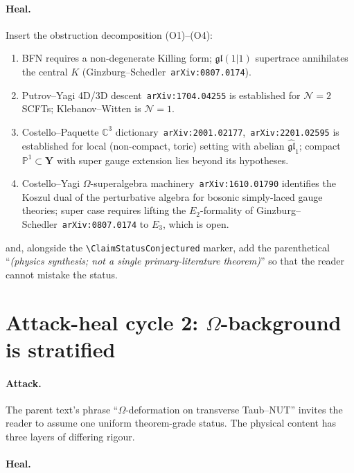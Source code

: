 \documentclass[11pt]{amsart}
\theoremstyle{definition}
\providecommand{\bY}{\mathbf{Y}}
\providecommand{\bC}{\mathbb{C}}
\providecommand{\bP}{\mathbb{P}}
\providecommand{\fgl}{\mathfrak{gl}}
\providecommand{\cN}{\mathcal{N}}
\begin{document}
\paragraph*{Heal.}
Insert the obstruction decomposition (O1)--(O4):
\begin{enumerate}[leftmargin=2em,label=(O\arabic*)]
\item BFN requires a non-degenerate Killing form; $\fgl(1|1)$
  supertrace annihilates the central $K$
  (Ginzburg--Schedler~\texttt{arXiv:0807.0174}).
\item Putrov--Yagi 4D/3D descent~\texttt{arXiv:1704.04255} is
  established for $\cN=2$ SCFTs; Klebanov--Witten is $\cN=1$.
\item Costello--Paquette $\bC^3$
  dictionary~\texttt{arXiv:2001.02177},~\texttt{arXiv:2201.02595} is
  established for local (non-compact, toric) setting with abelian
  $\widehat{\fgl}_1$; compact $\bP^1 \subset \bY$ with super gauge
  extension lies beyond its hypotheses.
\item Costello--Yagi $\Omega$-superalgebra
  machinery~\texttt{arXiv:1610.01790} identifies the Koszul dual of
  the perturbative algebra for bosonic simply-laced gauge theories;
  super case requires lifting the $E_2$-formality of
  Ginzburg--Schedler~\texttt{arXiv:0807.0174} to $E_3$, which is open.
\end{enumerate}
and, alongside the \texttt{\textbackslash ClaimStatusConjectured}
marker, add the parenthetical ``\emph{(physics synthesis; not a
single primary-literature theorem)}'' so that the reader cannot
mistake the status.

\section{Attack-heal cycle 2: $\Omega$-background is stratified}

\paragraph*{Attack.}
The parent text's phrase ``$\Omega$-deformation on transverse
Taub--NUT'' invites the reader to assume one uniform theorem-grade
status. The physical content has three layers of differing rigour.

\paragraph*{Heal.}
\end{document}
